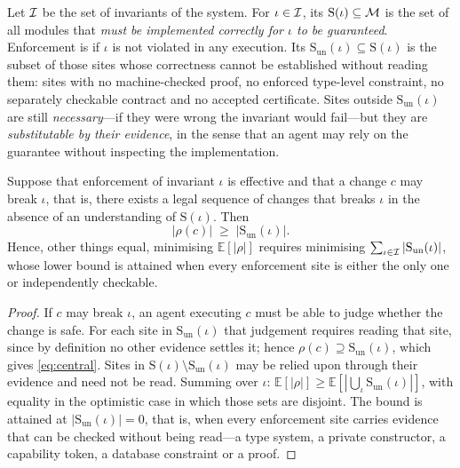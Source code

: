 \begin{definition}\label{def:enforce}
Let $\mathcal{I}$ be the set of invariants of the system. For $\iota \in \mathcal{I}$, its
 $\mathrm{S}(\iota) \subseteq \mathcal{M}$ is the set of all modules
that \emph{must be implemented correctly for $\iota$ to be guaranteed}. Enforcement is
 if $\iota$ is not violated in any execution. Its 
$\mathrm{S}_{\mathrm{un}}(\iota) \subseteq \mathrm{S}(\iota)$ is the subset of those sites whose
correctness cannot be established without reading them: sites with no machine-checked proof, no
enforced type-level constraint, no separately checkable contract and no accepted certificate. Sites
outside $\mathrm{S}_{\mathrm{un}}(\iota)$ are still \emph{necessary}---if they were wrong the
invariant would fail---but they are \emph{substitutable by their evidence}, in the sense that an
agent may rely on the guarantee without inspecting the implementation.
\end{definition}

\begin{theorem}\label{th:centralise}
Suppose that enforcement of invariant $\iota$ is effective and that a change $c$ may break
$\iota$, that is, there exists a legal sequence of changes that breaks $\iota$ in the
absence of an understanding of $\mathrm{S}(\iota)$. Then
\begin{equation}\label{eq:central}
|\rho(c)| \;\ge\; \bigl|\mathrm{S}_{\mathrm{un}}(\iota)\bigr| .
\end{equation}
Hence, other things equal, minimising $\mathbb{E}[|\rho|]$ requires minimising
$\sum_{\iota \in \mathcal{I}} |\mathrm{S}_{\mathrm{un}}(\iota)|$, whose lower bound is attained when every
enforcement site is either the only one or independently checkable.
\end{theorem}

\begin{proof}
If $c$ may break $\iota$, an agent executing $c$ must be able to judge whether the change is safe.
For each site in $\mathrm{S}_{\mathrm{un}}(\iota)$ that judgement requires reading that site, since
by definition no other evidence settles it; hence
$\rho(c) \supseteq \mathrm{S}_{\mathrm{un}}(\iota)$, which gives \eqref{eq:central}. Sites in
$\mathrm{S}(\iota) \setminus \mathrm{S}_{\mathrm{un}}(\iota)$ may be relied upon through their
evidence and need not be read. Summing over $\iota$:
$\mathbb{E}[|\rho|] \ge \mathbb{E}[|\bigcup_\iota \mathrm{S}_{\mathrm{un}}(\iota)|]$, with equality
in the optimistic case in which those sets are disjoint. The bound is attained at
$|\mathrm{S}_{\mathrm{un}}(\iota)| = 0$, that is, when every enforcement site carries evidence that
can be checked without being read---a type system, a private constructor, a capability token, a
database constraint or a proof.
\end{proof}

